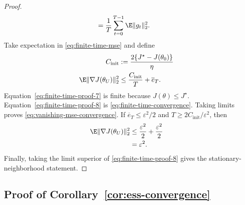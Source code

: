 \begin{proof}
\begin{align}
  &=\frac1T\sum_{t=0}^{T-1}\E\|g_t\|_2^2.
    \label{eq:finite-time-proof-6}
\end{align}
Take expectation in \eqref{eq:finite-time-mse} and define
\begin{align}
  C_{\mathrm{init}}
  &:=\frac{2\{J^\star-J(\theta_0)\}}{\eta}
    \label{eq:finite-time-proof-7}\\
  \E\|\nabla J(\theta_U)\|_2^2
  &\le\frac{C_{\mathrm{init}}}{T}+\overline e_T.
    \label{eq:finite-time-proof-8}
\end{align}
Equation~\eqref{eq:finite-time-proof-7} is finite because $J(\theta)\le J^\star$.
Equation~\eqref{eq:finite-time-proof-8} is
\eqref{eq:finite-time-convergence}.  Taking limits proves
\eqref{eq:vanishing-mse-convergence}.  If
$\overline e_T\le\varepsilon^2/2$ and
$T\ge2C_{\mathrm{init}}/\varepsilon^2$, then
\begin{align}
  \E\|\nabla J(\theta_U)\|_2^2
  &\le\frac{\varepsilon^2}{2}+\frac{\varepsilon^2}{2}
    \label{eq:finite-time-proof-9}\\
  &=\varepsilon^2.
    \label{eq:finite-time-proof-10}
\end{align}
Finally, taking the limit superior of \eqref{eq:finite-time-proof-8} gives the
stationary-neighborhood statement.
\end{proof}

\subsection{Proof of Corollary~\ref{cor:ess-convergence}}

